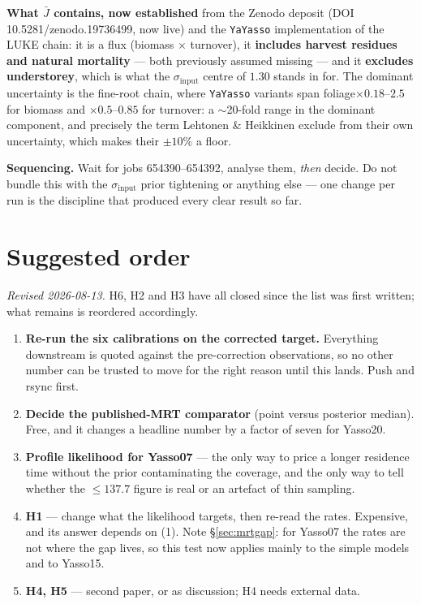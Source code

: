 \documentclass[11pt]{article}
\newcommand{\sinput}{\sigma_{\mathrm{input}}}
\begin{document}
\textbf{What $\bar{J}$ contains, now established} from the Zenodo deposit (DOI
10.5281/zenodo.19736499, now live) and the \texttt{YaYasso} implementation of the LUKE chain: it is
a flux (biomass $\times$ turnover), it \textbf{includes harvest residues and natural mortality} ---
both previously assumed missing --- and it \textbf{excludes understorey}, which is what the
$\sinput$ centre of $1.30$ stands in for. The dominant uncertainty is the fine-root chain, where
\texttt{YaYasso} variants span foliage$\times 0.18$--$2.5$ for biomass and $\times0.5$--$0.85$ for
turnover: a $\sim$20-fold range in the dominant component, and precisely the term Lehtonen \&
Heikkinen exclude from their own uncertainty, which makes their $\pm10\%$ a floor.

\textbf{Sequencing.} Wait for jobs 654390--654392, analyse them, \emph{then} decide. Do not bundle
this with the $\sinput$ prior tightening or anything else --- one change per run is the discipline
that produced every clear result so far.

\section{Suggested order}

\emph{Revised 2026-08-13.} H6, H2 and H3 have all closed since the list was first written; what
remains is reordered accordingly.

\begin{enumerate}
\item \textbf{Re-run the six calibrations on the corrected target.} Everything downstream is quoted
      against the pre-correction observations, so no other number can be trusted to move for the
      right reason until this lands. Push and rsync first.
\item \textbf{Decide the published-MRT comparator} (point versus posterior median). Free, and it
      changes a headline number by a factor of seven for Yasso20.
\item \textbf{Profile likelihood for Yasso07} --- the only way to price a longer residence time
      without the prior contaminating the coverage, and the only way to tell whether the
      $\le137.7$ figure is real or an artefact of thin sampling.
\item \textbf{H1} --- change what the likelihood targets, then re-read the rates. Expensive, and its
      answer depends on (1). Note \S\ref{sec:mrtgap}: for Yasso07 the rates are not where the gap lives, so this
      test now applies mainly to the simple models and to Yasso15.
\item \textbf{H4, H5} --- second paper, or as discussion; H4 needs external data.
\end{enumerate}
\end{document}
